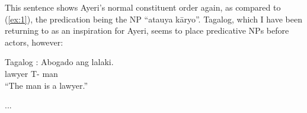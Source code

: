 \documentclass[12pt,paper=letter]{scrartcl}
\newcommand{\q}[1]{\enquote{#1}} %
\begin{document}
This sentence shows Ayeri's normal constituent order again, as compared to 
(\ref{ex:1}), the predication being the NP \q{atauya kāryo}. Tagalog,
which I have been returning to as an inspiration for Ayeri, seems to place 
predicative NPs before actors, however:

\begin{exe}
    \ex Tagalog \autocite[499]{schachter}:
    \gll Abogado ang lalaki. \\
    lawyer T- man \\
    \glt \enquote{The man is a lawyer.}
\end{exe}

...


\printbibliography
\end{document}
